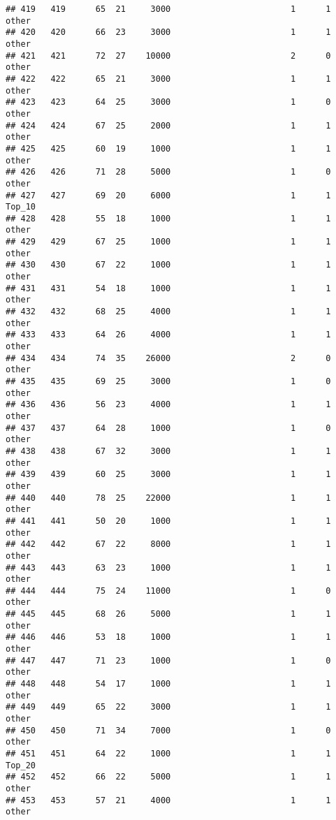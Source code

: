 \documentclass[
]{article}
\begin{document}
\begin{verbatim}
## 419   419      65  21     3000                        1      1    other
## 420   420      66  23     3000                        1      1    other
## 421   421      72  27    10000                        2      0    other
## 422   422      65  21     3000                        1      1    other
## 423   423      64  25     3000                        1      0    other
## 424   424      67  25     2000                        1      1    other
## 425   425      60  19     1000                        1      1    other
## 426   426      71  28     5000                        1      0    other
## 427   427      69  20     6000                        1      1   Top_10
## 428   428      55  18     1000                        1      1    other
## 429   429      67  25     1000                        1      1    other
## 430   430      67  22     1000                        1      1    other
## 431   431      54  18     1000                        1      1    other
## 432   432      68  25     4000                        1      1    other
## 433   433      64  26     4000                        1      1    other
## 434   434      74  35    26000                        2      0    other
## 435   435      69  25     3000                        1      0    other
## 436   436      56  23     4000                        1      1    other
## 437   437      64  28     1000                        1      0    other
## 438   438      67  32     3000                        1      1    other
## 439   439      60  25     3000                        1      1    other
## 440   440      78  25    22000                        1      1    other
## 441   441      50  20     1000                        1      1    other
## 442   442      67  22     8000                        1      1    other
## 443   443      63  23     1000                        1      1    other
## 444   444      75  24    11000                        1      0    other
## 445   445      68  26     5000                        1      1    other
## 446   446      53  18     1000                        1      1    other
## 447   447      71  23     1000                        1      0    other
## 448   448      54  17     1000                        1      1    other
## 449   449      65  22     3000                        1      1    other
## 450   450      71  34     7000                        1      0    other
## 451   451      64  22     1000                        1      1   Top_20
## 452   452      66  22     5000                        1      1    other
## 453   453      57  21     4000                        1      1    other

\end{verbatim}
\end{document}
